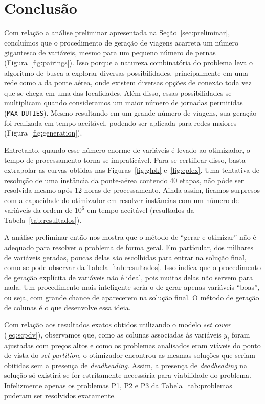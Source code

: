 \zerar
\chapter{Conclusão}
\label{cap:conclusao}

Com relação a análise preliminar apresentada na Seção~\ref{sec:preliminar}, concluímos que o
procedimento de geração de viagens acarreta um número gigantesco de variáveis, mesmo para um
pequeno número de pernas (Figura~\ref{fig:pairings}). Isso porque a natureza combinatória do
problema leva o algoritmo de busca a explorar diversas possibilidades, principalmente em uma rede
como a da ponte aérea, onde existem diversas opções de conexão toda vez que se chega em uma das
localidades. Além disso, essas possibilidades se multiplicam quando consideramos um maior número de
jornadas permitidas (\verb|MAX_DUTIES|). Mesmo resultando em um grande número de viagens, sua
geração foi realizada em tempo aceitável, podendo ser aplicada para redes maiores
(Figura~\ref{fig:generation}).

Entretanto, quando esse número enorme de variáveis é levado ao otimizador, o tempo de processamento
torna-se impraticável. Para se certificar disso, basta extrapolar as curvas obtidas nas
Figuras~\ref{fig:glpk} e~\ref{fig:cplex}. Uma tentativa de resolução de uma instância da ponte-aérea
contendo 40 etapas, não pôde ser resolvida mesmo após 12 horas de processamento. Ainda assim,
ficamos surpresos com a capacidade do otimizador em resolver instâncias com um número de variáveis
da ordem de $10^6$ em tempo aceitável (resultados da Tabela~\ref{tab:resultados}).

A análise preliminar então nos mostra que o método de ``gerar-e-otimizar'' não é adequado para
resolver o problema de forma geral. Em particular, dos milhares de variáveis geradas, poucas delas
são escolhidas para entrar na solução final, como se pode observar da Tabela~\ref{tab:resultados}.
Isso indica que o procedimento de geração explícita de variáveis não é ideal, pois muitas delas
não servem para nada. Um procedimento mais inteligente seria o de gerar apenas variáveis ``boas'',
ou seja, com grande chance de aparecerem na solução final. O método de geração de colunas é o que
desenvolve essa ideia.

Com relação aos resultados exatos obtidos utilizando o modelo {\it set cover} (\ref{eq:scpdv}), 
observamos que, como as colunas associadas às variáveis $y_i$ foram ajustadas com preços altos e 
como os problemas analisados eram viáveis do ponto de vista do {\it set partition}, o otimizador 
encontrou as mesmas soluções que seriam obitidas sem a presença de {\it deadheading}. Assim, a 
presença de {\it deadheading} na solução só existirá se for estritamente necessária para 
viabilidade do problema. Infelizmente apenas os problemas P1, P2 e P3 da Tabela~\ref{tab:problemas}
puderam ser resolvidos exatamente.

